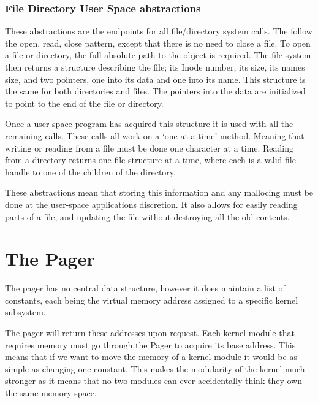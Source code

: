 \documentclass[a4paper]{report}
\begin{document}
\subsubsection{File Directory User Space abstractions}

These abstractions are the endpoints for all file/directory system calls. The follow the open, read, close pattern, except that there is no need to close a file. To open a file or directory, the full absolute path to the object is required. The file system then returns a structure describing the file; its Inode number, its size, its names size, and two pointers, one into its data and one into its name. This structure is the same for both directories and files. The pointers into the data are initialized to point to the end of the file or directory.

Once a user-space program has acquired this structure it is used with all the remaining calls. These calls all work on a `one at a time' method. Meaning that writing or reading from a file must be done one character at a time. Reading from a directory returns one file structure at a time, where each is a valid file handle to one of the children of the directory.

These abstractions mean that storing this information and any mallocing must be done at the user-space applications discretion. It also allows for easily reading parts of a file, and updating the file without destroying all the old contents.




















\section{The Pager}

The pager has no central data structure, however it does maintain a list of constants, each being the virtual memory address assigned to a specific kernel subsystem.

The pager will return these addresses upon request. Each kernel module that requires memory must go through the Pager to acquire its base address. This means that if we want to move the memory of a kernel module it would be as simple as changing one constant. This makes the modularity of the kernel much stronger as it means that no two modules can ever accidentally think they own the same memory space.
\end{document}
